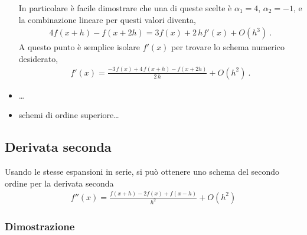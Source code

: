 \documentclass[letterpaper,10pt,italian]{jupyterBook}
\begin{document}
\begin{itemize}
\sphinxAtStartPar
In particolare è facile dimostrare che una di queste scelte è \(\alpha_1 = 4\), \(\alpha_2 = -1\), e la combinazione lineare per questi valori diventa,
\begin{equation*}
\begin{split}4 f(x+h) - f(x+2h) = 3 f(x) + 2 \, h f'(x) + O(h^3) \ .\end{split}
\end{equation*}
\sphinxAtStartPar
A questo punto è semplice isolare \(f'(x)\) per trovare lo schema numerico desiderato,
\begin{equation*}
\begin{split}f'(x) = \frac{-3 \, f(x) + 4 \, f(x+h) - f(x+2h)}{2 \, h} + O(h^2) \ .\end{split}
\end{equation*}
\item {} 
\sphinxAtStartPar
…

\item {} 
\sphinxAtStartPar
schemi di ordine superiore…

\end{itemize}


\subsection{Derivata seconda}
\label{\detokenize{ch/numerics/derivatives:derivata-seconda}}
\sphinxAtStartPar
Usando le stesse espansioni in serie, si può ottenere uno schema del secondo ordine per la derivata seconda
\begin{equation*}
\begin{split}f''(x) = \frac{f(x+h) - 2 f(x) + f(x-h)}{h^2} + O(h^2)\end{split}
\end{equation*}\subsubsection*{Dimostrazione}
\end{document}
